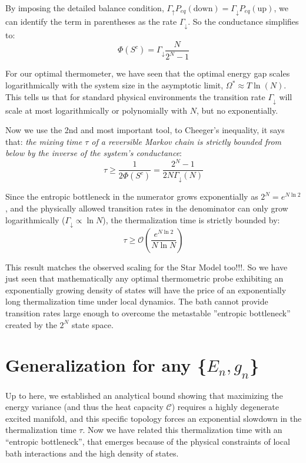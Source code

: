 \documentclass{article}
\begin{document}
By imposing the detailed balance condition, $\Gamma_{\uparrow} P_{eq}(\text{down}) = \Gamma_{\downarrow} P_{eq}(\text{up})$, we can identify the term in parentheses as the rate $\Gamma_{\downarrow}$. So the conductance simplifies to:
\begin{equation}
    \Phi(S^c) = \Gamma_{\downarrow} \frac{N}{2^N - 1}
\end{equation}

For our optimal thermometer, we have seen that the optimal energy gap scales logarithmically with the system size in the asymptotic limit, $\Omega^* \approx T \ln(N)$. This tells us that for standard physical environments the transition rate $\Gamma_{\downarrow}$ will scale at most logarithmically or polynomially with $N$, but no exponentially.

Now we use the 2nd and most important tool, to Cheeger's inequality, it says that: \textit{the mixing time $\tau$ of a reversible Markov chain is strictly bounded from below by the inverse of the system's conductance}:
\begin{equation}
    \tau \ge \frac{1}{2\Phi(S^c)} = \frac{2^N - 1}{2 N \Gamma_{\downarrow}(N)}
\end{equation}

Since the entropic bottleneck in the numerator grows exponentially as $2^N = e^{N \ln 2}$, and the physically allowed transition rates in the denominator can only grow logarithmically ($\Gamma_{\downarrow} \propto \ln N$), the thermalization time is strictly bounded by:
\begin{equation}
    \tau \ge \mathcal{O}\left( \frac{e^{N \ln 2}}{N \ln N} \right)
\end{equation}

This result matches the observed scaling for the Star Model too!!!. So we have just seen that mathematically any optimal thermometric probe exhibiting an exponentially growing density of states will have the price of an exponentially long thermalization time under local dynamics. The bath cannot provide transition rates large enough to overcome the metastable ''entropic bottleneck'' created by the $2^N$ state space.

\section{Generalization for any \{$E_n,g_n$\}}

Up to here, we established an analytical bound showing that maximizing the energy variance (and thus the heat capacity $\mathcal{C}$) requires a highly degenerate excited manifold, and this specific topology forces an exponential slowdown in the thermalization time $\tau$. Now we have related this thermalization time with an ``entropic bottleneck'', that emerges because of the physical constraints of local bath interactions and the high density of states. 
\end{document}
